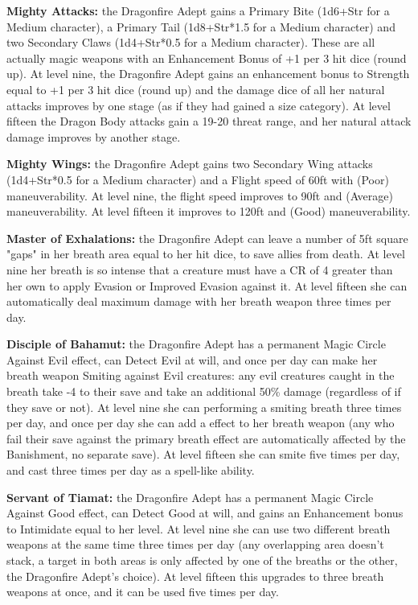 \begin{itemize*}
\item \textbf{Mighty Attacks:} the Dragonfire Adept gains a Primary Bite (1d6+Str for a Medium character), a Primary Tail (1d8+Str*1.5 for a Medium character) and two Secondary Claws (1d4+Str*0.5 for a Medium character). These are all actually magic weapons with an Enhancement Bonus of +1 per 3 hit dice (round up). At level nine, the Dragonfire Adept gains an enhancement bonus to Strength equal to +1 per 3 hit dice (round up) and the damage dice of all her natural attacks improves by one stage (as if they had gained a size category). At level fifteen the Dragon Body attacks gain a 19-20 threat range, and her natural attack damage improves by another stage.
\item \textbf{Mighty Wings:} the Dragonfire Adept gains two Secondary Wing attacks (1d4+Str*0.5 for a Medium character) and a Flight speed of 60ft with (Poor) maneuverability. At level nine, the flight speed improves to 90ft  and (Average) maneuverability. At level fifteen it improves to 120ft and (Good) maneuverability.
\item \textbf{Master of Exhalations:} the Dragonfire Adept can leave a number of 5ft square "gaps" in her breath area equal to her hit dice, to save allies from death. At level nine her breath is so intense that a creature must have a CR of 4 greater than her own to apply Evasion or Improved Evasion against it. At level fifteen she can automatically deal maximum damage with her breath weapon three times per day.
\item \textbf{Disciple of Bahamut:} the Dragonfire Adept has a permanent Magic Circle Against Evil effect, can Detect Evil at will, and once per day can make her breath weapon Smiting against Evil creatures: any evil creatures caught in the breath take -4 to their save and take an additional 50\% damage (regardless of if they save or not). At level nine she can performing a smiting breath three times per day, and once per day she can add a  effect to her breath weapon (any who fail their save against the primary breath effect are automatically affected by the Banishment, no separate save). At level fifteen she can smite five times per day, and cast  three times per day as a spell-like ability.
\item \textbf{Servant of Tiamat:} the Dragonfire Adept has a permanent Magic Circle Against Good effect, can Detect Good at will, and gains an Enhancement bonus to Intimidate equal to her level. At level nine she can use two different breath weapons at the same time three times per day (any overlapping area doesn't stack, a target in both areas is only affected by one of the breaths or the other, the Dragonfire Adept's choice). At level fifteen this upgrades to three breath weapons at once, and it can be used five times per day.

\end{itemize*}
